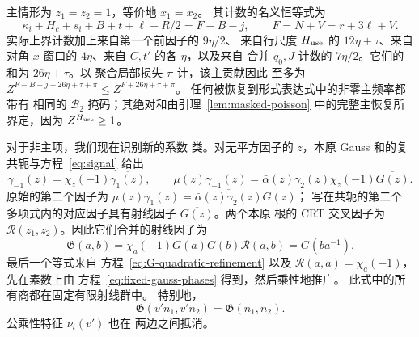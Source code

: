 主情形为 \(z_1=z_2=1\)，等价地 \(x_1=x_2\)。
其计数的名义恒等式为
\begin{equation}\label{eq:second-principal-exponent}
 \kappa_i+H_c+s_i+B+t+\ell+R/2=F-B-j,
 \qquad F=N+V=r+3\ell+V.
\end{equation}
实际上界计数加上来自第一个前因子的 \(9\eta/2\)、
来自行尺度 \(H_{\rm use}\) 的 \(12\eta+\tau\)、来自
对角 \(x\)-窗口的 \(4\eta\)、来自 \(C,t'\) 的各 \(\eta\)，以及来自
合并 \(q_0,J\) 计数的 \(7\eta/2\)。它们的和为 \(26\eta+\tau\)。以
聚合局部损失 \(\pi\) 计，该主贡献因此
至多为 \(Z^{F-B-j+26\eta+\tau+\pi}\le Z^{F+26\eta+\tau+\pi}\)。
任何被恢复到形式表达式中的非零主频率都带有
相同的 \(\mathcal B_2\) 掩码；其绝对和由引理~\ref{lem:masked-poisson}
中的完整主恢复所界定，因为
\(Z^{H_{\rm use}}\ge1\)。

对于非主项，我们现在识别新的系数
类。对无平方因子的 \(z\)，本原
Gauss 和的复共轭与方程~\eqref{eq:signal} 给出
\[
 \gamma_{-1}(z)=\chi_z(-1)\overline{\gamma_1(z)},\qquad
 \mu(z)\gamma_{-1}(z)
 =\bar\alpha(z)\gamma_2(z)\chi_z(-1)\overline{G(z)}.
\]
原始的第二个因子为
\(\mu(z)\gamma_1(z)=\overline{\bar\alpha(z)\gamma_2(z)}G(z)\)；
写在共轭的第二个
多项式内的对应因子具有射线因子 \(\overline{G(z)}\)。两个本原
根的 CRT 交叉因子为 \(\mathcal R(z_1,z_2)\)。因此它们合并的射线因子为
\[
 \mathfrak G(a,b)=\chi_a(-1)\overline{G(a)}G(b)\mathcal R(a,b)
       =G(ba^{-1}).
\]
最后一个等式来自
方程~\eqref{eq:G-quadratic-refinement} 以及
\(\mathcal R(a,a)=\chi_a(-1)\)，先在素数上由
方程~\eqref{eq:fixed-gauss-phases} 得到，然后乘性地推广。
此式中的所有商都在固定有限射线群中。
特别地，
\[
 \mathfrak G(v'n_1,v'n_2)=\mathfrak G(n_1,n_2).
\]
公乘性特征 \(\nu_i(v')\) 也在
两边之间抵消。

